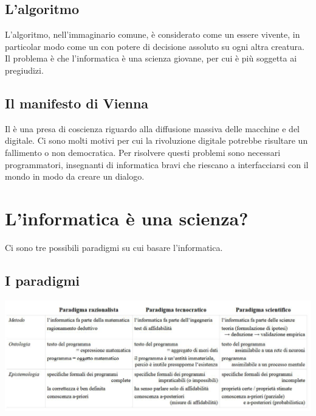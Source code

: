 \subsection{L'algoritmo}

L'algoritmo, nell'immaginario comune, è considerato come un essere vivente, in particolar modo come un  con potere di decisione assoluto su ogni altra creatura. Il problema è che l'informatica è una scienza giovane, per cui è più soggetta ai pregiudizi.

\subsection{Il manifesto di Vienna}

Il  è una presa di coscienza riguardo alla diffusione massiva delle macchine e del digitale. Ci sono molti motivi per cui la rivoluzione digitale potrebbe risultare un fallimento o non democratica. Per risolvere questi problemi sono necessari programmatori, insegnanti di informatica bravi che riescano a interfacciarsi con il mondo in modo da creare un dialogo.


\section{L'informatica è una scienza?}

Ci sono tre possibili paradigmi su cui basare l'informatica.

\subsection{I paradigmi}

\begin{center}
    \includegraphics[scale = 0.4]{images/introduzione/Paradigmi.png}
\end{center}


